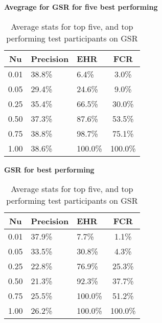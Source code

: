 \begin{table}[h]
  \centering
  \textbf{Avegrage for GSR for five best performing}\vspace{2pt}
  \begin{tabularx}{\columnwidth}{cXXc}
    \toprule
    \textbf{Nu} & \textbf{Precision} & \textbf{EHR} & \textbf{FCR} \\
    \midrule
    0.01        & 38.8\%             & 6.4\%        & 3.0\%        \\ \hline
    0.05        & 29.4\%             & 24.6\%       & 9.0\%        \\ \hline
    0.25        & 35.4\%             & 66.5\%       & 30.0\%       \\ \hline
    0.50        & 37.3\%             & 87.6\%       & 53.5\%       \\ \hline
    0.75        & 38.8\%             & 98.7\%       & 75.1\%       \\ \hline
    1.00        & 38.6\%             & 100.0\%      & 100.0\%      \\ \hline
    \bottomrule
  \end{tabularx}

  \textbf{GSR for best performing}\vspace{2pt}
  \begin{tabularx}{\columnwidth}{cXXc}
    \toprule
    \textbf{Nu} & \textbf{Precision} & \textbf{EHR} & \textbf{FCR} \\
    \midrule
    0.01        & 37.9\%             & 7.7\%        & 1.1\%        \\ \hline
    0.05        & 33.5\%             & 30.8\%       & 4.3\%        \\ \hline
    0.25        & 22.8\%             & 76.9\%       & 25.3\%       \\ \hline
    0.50        & 21.3\%             & 92.3\%       & 37.7\%       \\ \hline
    0.75        & 25.5\%             & 100.0\%      & 51.2\%       \\ \hline
    1.00        & 26.2\%             & 100.0\%      & 100.0\%      \\ \hline
    \bottomrule
  \end{tabularx}
  \caption{Average stats for top five, and top performing test participants on GSR}
  \label{tab:best_five_avg_stats}
\end{table}